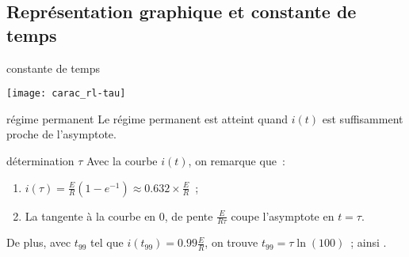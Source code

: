 \documentclass[../main/main.tex]{subfiles}
\begin{document}
\subsection{Représentation graphique et constante de temps}
\begin{tcbraster}[raster columns=2, raster equal height=rows]
    \begin{impl}[label=impl:tauRC]{constante de temps}
        \begin{center}
            \texttt{[image: carac\_rl-tau]}
        \end{center}
    \end{impl}
    \begin{tcolorbox}[blankest, raster multicolumn=1]%
        \begin{tcbraster}[raster columns=1]
            \begin{defi}[label=def:regmperma]{régime permanent}
                Le régime permanent est atteint quand $i(t)$ est
                suffisamment proche de l'asymptote.
            \end{defi}
            \begin{exem}[label=impl:déterm]{détermination $\tau$}
                Avec la courbe $i(t)$, on remarque que~:
                \begin{enumerate}
                    \item $i(\tau) = \frac{E}{R} \left( 1-e^{-1} \right) \approx
                        \num{0.632}\times \frac{E}{R}$~;
                    \item La tangente à la courbe en 0, de pente $
                        \frac{E}{R\tau}$ coupe l'asymptote en $t = \tau$.
                \end{enumerate}
                De plus, avec $t_{99}$ tel que $i(t_{99}) =
                \num{0.99}\frac{E}{R}$, on trouve $t_{99} = \tau\ln(100)$~;
                ainsi .
            \end{exem}
        \end{tcbraster}
    \end{tcolorbox}
\end{tcbraster}
\end{document}

